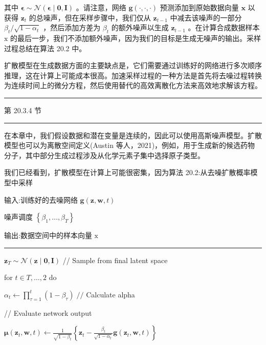 \documentclass[10pt]{article}
\newcommand{\HRule}{\begin{center}\rule{0.9\linewidth}{0.2mm}\end{center}}
\begin{document}
其中 \(\mathbf{\epsilon } \sim  \mathcal{N}\left( {\mathbf{\epsilon } \mid  \mathbf{0},\mathbf{I}}\right)\) 。请注意，网络 \(\mathbf{g}\left( {\cdot ,\cdot , \cdot  }\right)\) 预测添加到原始数据向量 \(\mathbf{x}\) 以获得 \({\mathbf{z}}_{t}\) 的总噪声，但在采样步骤中，我们仅从 \({\mathbf{z}}_{t - 1}\) 中减去该噪声的一部分 \({\beta }_{t}/\sqrt{1 - {\alpha }_{t}}\) ，然后添加方差为 \({\beta }_{t}\) 的额外噪声以生成 \({\mathbf{z}}_{t - 1}\) 。在计算合成数据样本 \(\mathrm{x}\) 的最后一步，我们不添加额外噪声，因为我们的目标是生成无噪声的输出。采样过程总结在算法 20.2 中。

扩散模型在生成数据方面的主要缺点是，它们需要通过训练好的网络进行多次顺序推理，这在计算上可能成本很高。加速采样过程的一种方法是首先将去噪过程转换为连续时间上的微分方程，然后使用替代的高效离散化方法来高效地求解该方程。

\HRule

第 20.3.4 节

\HRule

在本章中，我们假设数据和潜在变量是连续的，因此可以使用高斯噪声模型。扩散模型也可以为离散空间定义(Austin 等人，2021)，例如，用于生成新的候选药物分子，其中部分生成过程涉及从化学元素子集中选择原子类型。

我们已经看到，扩散模型在计算上可能很密集，因为算法 20.2:从去噪扩散概率模型中采样

输入:训练好的去噪网络 \(\mathbf{g}\left( {\mathbf{z},\mathbf{w},t}\right)\)

噪声调度 \(\left\{  {{\beta }_{1},\ldots ,{\beta }_{T}}\right\}\)

输出:数据空间中的样本向量 \(\mathrm{x}\)

\HRule

\({\mathbf{z}}_{T} \sim  \mathcal{N}\left( {\mathbf{z} \mid  \mathbf{0},\mathbf{I}}\right)\) // Sample from final latent space

for \(t \in  T,\ldots ,2\) do

\hspace*{1em} \({\alpha }_{t} \leftarrow  \mathop{\prod }\limits_{{\tau  = 1}}^{t}\left( {1 - {\beta }_{\tau }}\right) \;//\) Calculate alpha

\hspace*{1em} // Evaluate network output

\hspace*{1em} \(\mathbf{\mu }\left( {{\mathbf{z}}_{t},\mathbf{w},t}\right)  \leftarrow  \frac{1}{\sqrt{1 - {\beta }_{t}}}\left\{  {{\mathbf{z}}_{t} - \frac{{\beta }_{t}}{\sqrt{1 - {\alpha }_{t}}}\mathbf{g}\left( {{\mathbf{z}}_{t},\mathbf{w},t}\right) }\right\}\)
\end{document}
